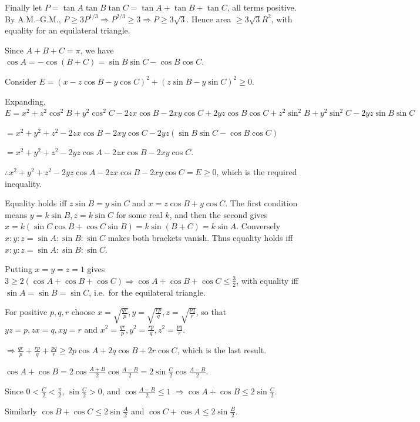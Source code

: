   Finally let $P = \tan A\tan B\tan C = \tan A + \tan B + \tan C$, all terms positive. By A.M.--G.M.,
  $P\geq 3P^{1/3}\Rightarrow P^{2/3}\geq 3\Rightarrow P\geq 3\sqrt{3}$. Hence area $\geq 3\sqrt{3}R^2$, with
  equality for an equilateral triangle.
\item Since $A + B + C = \pi$, we have $\cos A = -\cos(B + C) = \sin B\sin C - \cos B\cos C$.

  Consider $E = (x - z\cos B - y\cos C)^2 + (z\sin B - y\sin C)^2\geq 0$.

  Expanding, $E = x^2 + z^2\cos^2B + y^2\cos^2C - 2zx\cos B - 2xy\cos C + 2yz\cos B\cos C + z^2\sin^2B +
  y^2\sin^2C - 2yz\sin B\sin C$

  $= x^2 + y^2 + z^2 - 2zx\cos B - 2xy\cos C - 2yz(\sin B\sin C - \cos B\cos C)$

  $= x^2 + y^2 + z^2 - 2yz\cos A - 2zx\cos B - 2xy\cos C$.

  $\therefore x^2 + y^2 + z^2 - 2yz\cos A - 2zx\cos B - 2xy\cos C = E\geq 0$, which is the required
  inequality.

  Equality holds iff $z\sin B = y\sin C$ and $x = z\cos B + y\cos C$. The first condition means $y = k\sin
  B, z = k\sin C$ for some real $k$, and then the second gives $x = k(\sin C\cos B + \cos C\sin B) = k\sin(B
  + C) = k\sin A$. Conversely $x:y:z = \sin A:\sin B:\sin C$ makes both brackets vanish. Thus equality holds
  iff $x:y:z = \sin A:\sin B:\sin C$.

  Putting $x = y = z = 1$ gives $3\geq 2(\cos A + \cos B + \cos C)\Rightarrow\cos A + \cos B + \cos
  C\leq\frac{3}{2}$, with equality iff $\sin A = \sin B = \sin C$, i.e.\ for the equilateral triangle.

  For positive $p, q, r$ choose $x = \sqrt{\frac{qr}{p}}, y = \sqrt{\frac{rp}{q}}, z = \sqrt{\frac{pq}{r}}$,
  so that $yz = p, zx = q, xy = r$ and $x^2 = \frac{qr}{p}, y^2 = \frac{rp}{q}, z^2 = \frac{pq}{r}$.

  $\Rightarrow\frac{qr}{p} + \frac{rp}{q} + \frac{pq}{r}\geq 2p\cos A + 2q\cos B + 2r\cos C$, which is the
  last result.
\item $\cos A + \cos B = 2\cos\frac{A + B}{2}\cos\frac{A - B}{2} = 2\sin\frac{C}{2}\cos\frac{A - B}{2}$.

  Since $0 < \frac{C}{2} < \frac{\pi}{2}$, $\sin\frac{C}{2} > 0$, and $\cos\frac{A - B}{2}\leq 1$
  $\Rightarrow\cos A + \cos B\leq 2\sin\frac{C}{2}$.

  Similarly $\cos B + \cos C\leq 2\sin\frac{A}{2}$ and $\cos C + \cos A\leq 2\sin\frac{B}{2}$.

